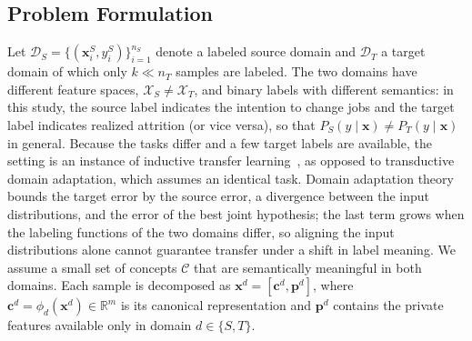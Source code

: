 \documentclass[runningheads]{llncs}
\begin{document}
\subsection{Problem Formulation}
Let $\mathcal{D}_S=\{(\mathbf{x}^S_i,y^S_i)\}_{i=1}^{n_S}$ denote a labeled source domain and $\mathcal{D}_T$ a target domain of which only $k\ll n_T$ samples are labeled. The two domains have different feature spaces, $\mathcal{X}_S\neq\mathcal{X}_T$, and binary labels with different semantics: in this study, the source label indicates the intention to change jobs and the target label indicates realized attrition (or vice versa), so that $P_S(y\mid\mathbf{x})\neq P_T(y\mid\mathbf{x})$ in general. Because the tasks differ and a few target labels are available, the setting is an instance of inductive transfer learning~\cite{pan2010}, as opposed to transductive domain adaptation, which assumes an identical task. Domain adaptation theory~\cite{bendavid2010} bounds the target error by the source error, a divergence between the input distributions, and the error of the best joint hypothesis; the last term grows when the labeling functions of the two domains differ, so aligning the input distributions alone cannot guarantee transfer under a shift in label meaning. We assume a small set of concepts $\mathcal{C}$ that are semantically meaningful in both domains. Each sample is decomposed as $\mathbf{x}^d=[\mathbf{c}^d,\mathbf{p}^d]$, where $\mathbf{c}^d=\phi_d(\mathbf{x}^d)\in\mathbb{R}^{m}$ is its canonical representation and $\mathbf{p}^d$ contains the private features available only in domain $d\in\{S,T\}$.
\end{document}
